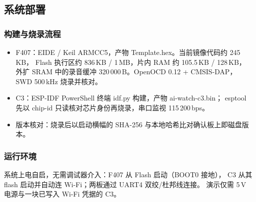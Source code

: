 \subsection{系统部署}
\subsubsection{构建与烧录流程}
\begin{itemize}
  \item F407：EIDE / Keil ARMCC5，产物 Template.hex。当前镜像代码约 245\,KB，
        Flash 执行区约 836\,KB / 1\,MB，片内 RAM 约 105.5\,KB / 128\,KB，
        外扩 SRAM 中的录音缓冲 320\,000\,B。OpenOCD 0.12 + CMSIS-DAP，
        SWD 500\,kHz 烧录并核对。
  \item C3：ESP-IDF PowerShell 终端 idf.py 构建，产物 ai-watch-c3.bin；
        esptool 先以 chip-id 只读核对芯片身份再烧录，串口监视 115\,200\,bps。
  \item 版本核对：烧录后以启动横幅的 SHA-256 与本地哈希比对确认板上即磁盘版本。
\end{itemize}

\subsubsection{运行环境}
系统上电自启，无需调试器介入：F407 从 Flash 启动（BOOT0 接地），
C3 从其 flash 启动并自动连 Wi-Fi；两板通过 UART4 双绞/杜邦线连接。
演示仅需 5\,V 电源与一块已写入 Wi-Fi 凭据的 C3。
